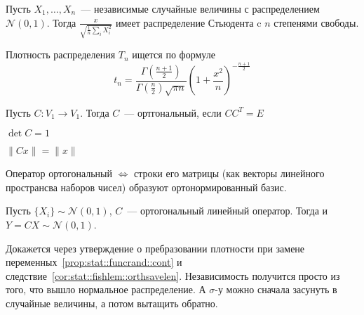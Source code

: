 \documentclass[12pt,ebook]{../../../notes}
\begin{document}
\begin{defn}\label{defn:stat::fishlem::student}
  Пусть $X_1, \dotsc, X_n$~--- независимые случайные величины с распределением $\mathcal N(0,1)$.
  Тогда $\displaystyle \frac{x}{\sqrt{\frac{1}{n} \sum_i X_i^2}}$ имеет распределение Стьюдента 
  c $n$ степенями свободы. 
\end{defn}
\begin{prop}\label{prop:stat::fishlem::studens}
  Плотность распределения $T_n$ ищется по формуле 
  \[\displaystyle t_n = \dfrac{\Gamma(\frac{n+1}{2})}{\Gamma(\frac{n}{2}) \sqrt{\pi n}} 
  \left(1+\dfrac {x^2} n\right)^{-\frac{n+1}{2} } \]
\end{prop}


\begin{defn}\label{defn:stat::fishlem::orth}
  Пусть $C\colon V_1 \to V_1$. Тогда $C$~--- ортгональный, если $C C^T = E$
\end{defn}
\begin{cor}\label{cor:stat::fishlem::orth1}
  $\det C = 1$
\end{cor}
\begin{cor}\label{cor:stat::fishlem::orthsavelen}
  $\|Cx\| = \|x\|$
\end{cor}

\begin{prop}\label{prop:stat::fishlem::orthmtx}
  Оператор ортогональный $ \Leftrightarrow $ строки его матрицы 
  (как векторы линейного пространсва наборов чисел) образуют ортонормированный базис.
\end{prop}

\begin{prop}\label{prop:stat::fishlem::orthnorm}
  Пусть $\{X_i\} \sim \mathcal N(0,1)$, $C$~--- ортогональный линейный оператор. 
  Тогда и $Y = CX \sim \mathcal N (0,1)$.
\end{prop}
\begin{itlproof}
  Докажется через утверждение о пребразовании плотности при замене 
  переменных~\ref{prop:stat::funcrand::cont} 
  и следствие~\ref{cor:stat::fishlem::orthsavelen}. Независимость получится просто из того, что
  вышло нормальное распределение. А $\sigma$-у можно сначала засунуть в случайные величины, а
  потом вытащить обратно.
\end{itlproof}
\end{document}
